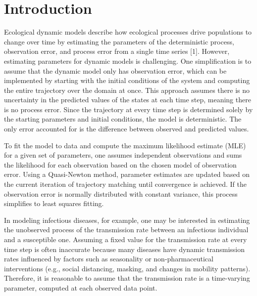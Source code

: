 \documentclass[
11pt, %
oneside, %
english, %
singlespacing, %
]{macthesis} %
\begin{document}
\label{lastoffront}
\clearpage


\mainmatter %
\pagestyle{thesis}
\chapter{Introduction}\label{introduction}

Ecological dynamic models describe how ecological processes drive populations to change over time by estimating the parameters of the deterministic process, observation error, and process error from a single time series {[}1{]}. However, estimating parameters for dynamic models is challenging. One simplification is to assume that the dynamic model only has observation error, which can be implemented by starting with the initial conditions of the system and computing the entire trajectory over the domain at once. This approach assumes there is no uncertainty in the predicted values of the states at each time step, meaning there is no process error. Since the trajectory at every time step is determined solely by the starting parameters and initial conditions, the model is deterministic. The only error accounted for is the difference between observed and predicted values.

To fit the model to data and compute the maximum likelihood estimate (MLE) for a given set of parameters, one assumes independent observations and sums the likelihood for each observation based on the chosen model of observation error. Using a Quasi-Newton method, parameter estimates are updated based on the current iteration of trajectory matching until convergence is achieved. If the observation error is normally distributed with constant variance, this process simplifies to least squares fitting.

In modeling infectious diseases, for example, one may be interested in estimating the unobserved process of the transmission rate between an infectious individual and a susceptible one. Assuming a fixed value for the transmission rate at every time step is often inaccurate because many diseases have dynamic transmission rates influenced by factors such as seasonality or non-pharmaceutical interventions (e.g., social distancing, masking, and changes in mobility patterns). Therefore, it is reasonable to assume that the transmission rate is a time-varying parameter, computed at each observed data point.
\end{document}
